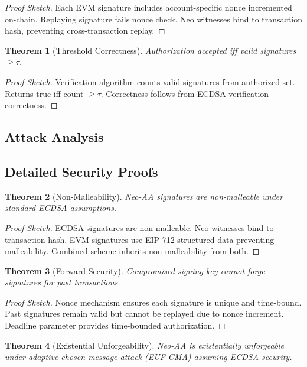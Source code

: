 \documentclass[10pt,twocolumn]{article}
\newtheorem{theorem}{Theorem}
\begin{document}
\begin{proof}[Proof Sketch]
Each EVM signature includes account-specific nonce incremented on-chain. Replaying signature fails nonce check. Neo witnesses bind to transaction hash, preventing cross-transaction replay.
\end{proof}

\begin{theorem}[Threshold Correctness]
Authorization accepted iff valid signatures $\geq \tau$.
\end{theorem}

\begin{proof}[Proof Sketch]
Verification algorithm counts valid signatures from authorized set. Returns true iff count $\geq \tau$. Correctness follows from ECDSA verification correctness.
\end{proof}

\subsection{Attack Analysis}

\subsection{Detailed Security Proofs}

\begin{theorem}[Non-Malleability]
Neo-AA signatures are non-malleable under standard ECDSA assumptions.
\end{theorem}

\begin{proof}[Proof Sketch]
ECDSA signatures are non-malleable. Neo witnesses bind to transaction hash. EVM signatures use EIP-712 structured data preventing malleability. Combined scheme inherits non-malleability from both.
\end{proof}

\begin{theorem}[Forward Security]
Compromised signing key cannot forge signatures for past transactions.
\end{theorem}

\begin{proof}[Proof Sketch]
Nonce mechanism ensures each signature is unique and time-bound. Past signatures remain valid but cannot be replayed due to nonce increment. Deadline parameter provides time-bounded authorization.
\end{proof}


\begin{theorem}[Existential Unforgeability]
Neo-AA is existentially unforgeable under adaptive chosen-message attack (EUF-CMA) assuming ECDSA security.
\end{theorem}
\end{document}
